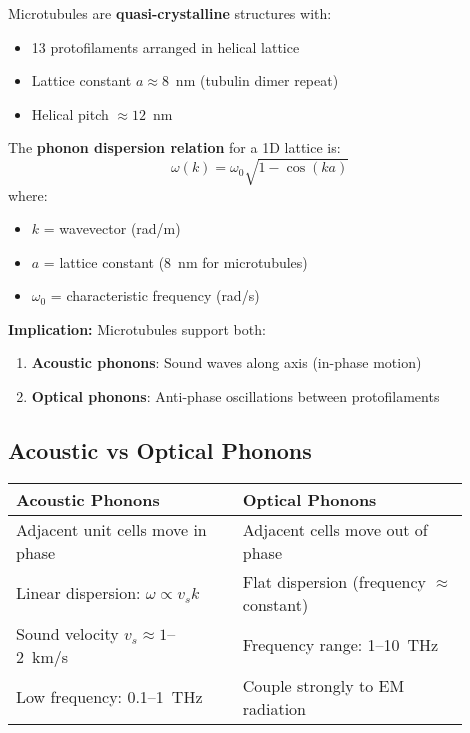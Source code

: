 Microtubules are \textbf{quasi-crystalline} structures with:
\begin{itemize}
\item 13 protofilaments arranged in helical lattice
\item Lattice constant $a \approx 8$~nm (tubulin dimer repeat)
\item Helical pitch $\approx 12$~nm
\end{itemize}

The \textbf{phonon dispersion relation} for a 1D lattice is:
\begin{equation}
\omega(k) = \omega_0 \sqrt{1 - \cos(ka)}
\label{eq:phonon-dispersion}
\end{equation}
where:
\begin{itemize}
\item $k$ = wavevector (rad/m)
\item $a$ = lattice constant (8~nm for microtubules)
\item $\omega_0$ = characteristic frequency (rad/s)
\end{itemize}

\textbf{Implication:} Microtubules support both:
\begin{enumerate}
\item \textbf{Acoustic phonons}: Sound waves along axis (in-phase motion)
\item \textbf{Optical phonons}: Anti-phase oscillations between protofilaments
\end{enumerate}

\subsection{Acoustic vs Optical Phonons}

\begin{center}
\begin{tabular}{@{}p{0.45\linewidth}p{0.45\linewidth}@{}}
\toprule
\textbf{Acoustic Phonons} & \textbf{Optical Phonons} \\
\midrule
Adjacent unit cells move in phase & Adjacent cells move out of phase \\
Linear dispersion: $\omega \propto v_s k$ & Flat dispersion (frequency $\approx$ constant) \\
Sound velocity $v_s \approx 1$--2~km/s & Frequency range: 1--10~THz \\
Low frequency: 0.1--1~THz & Couple strongly to EM radiation \\
\bottomrule
\end{tabular}
\end{center}


